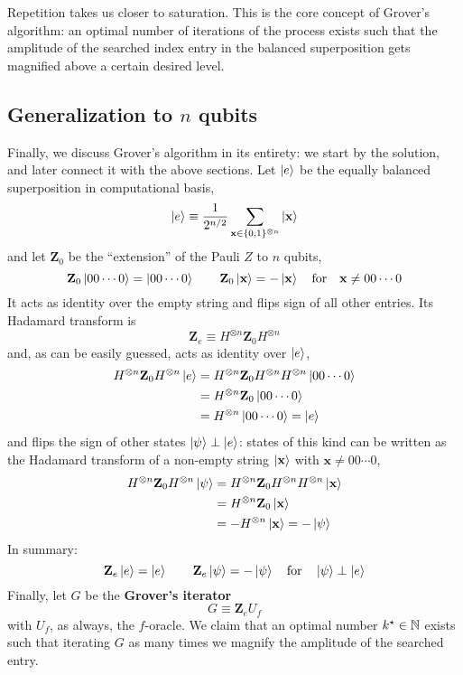 Repetition takes us closer to saturation. This is the core concept of Grover's algorithm: an optimal number of iterations of the process exists such that the amplitude of the searched index entry in the balanced superposition gets magnified above a certain desired level.

\subsection{Generalization to $n$ qubits}

Finally, we discuss Grover's algorithm in its entirety: we start by the solution, and later connect it with the above sections. Let $\ket{e}$ be the equally balanced superposition in computational basis,
\[
	\ket{e} \equiv \frac{1}{2^{n/2}} \sum_{\mathbf{x} \in \lbrace 0,1 \rbrace^{\otimes n}} \ket{\mathbf{x}}
\]
and let $\mathbf{Z}_0$ be the ``extension'' of the Pauli $Z$ to $n$ qubits,
\[
	\mathbf{Z}_0 \ket{00\cdots0} = \ket{00\cdots0}
	\qquad
	\mathbf{Z}_0 \ket{\mathbf{x}} = -\ket{\mathbf{x}} \qq{for} \mathbf{x} \neq 00\cdots0
\]
It acts as identity over the empty string and flips sign of all other entries. Its Hadamard transform is
\[
	\mathbf{Z}_e \equiv H^{\otimes n} \mathbf{Z}_0 H^{\otimes n}
\]
and, as can be easily guessed, acts as identity over $\ket{e}$,
\[
\begin{aligned}
	H^{\otimes n} \mathbf{Z}_0 H^{\otimes n} \ket{e} &= H^{\otimes n} \mathbf{Z}_0 H^{\otimes n} H^{\otimes n} \ket{00\cdots0} \\
	&= H^{\otimes n} \mathbf{Z}_0 \ket{00\cdots0} \\ 
	&= H^{\otimes n} \ket{00\cdots0} = \ket{e}
\end{aligned}
\]
and flips the sign of other states $\ket{\psi} \perp \ket{e}$: states of this kind can be written as the Hadamard transform of a non-empty string $\ket{\mathbf{x}}$ with $\mathbf{x} \neq 00\cdots0$,
\[
\begin{aligned}
	H^{\otimes n} \mathbf{Z}_0 H^{\otimes n} \ket{\psi} &= H^{\otimes n} \mathbf{Z}_0 H^{\otimes n} H^{\otimes n} \ket{\mathbf{x}} \\
	&= H^{\otimes n} \mathbf{Z}_0 \ket{\mathbf{x}} \\ 
	&= - H^{\otimes n} \ket{\mathbf{x}} = - \ket{\psi}
\end{aligned}
\]
In summary:
\[
	\mathbf{Z}_e \ket{e} = \ket{e}
	\qquad
	\mathbf{Z}_e \ket{\psi} = -\ket{\psi} \qq{for} \ket{\psi} \perp \ket{e}
\]
Finally, let $G$ be the \textbf{Grover's iterator}
\[
	G \equiv \mathbf{Z}_e U_f
\]
with $U_f$, as always, the $f$-oracle. We claim that an optimal number $k^\star \in \mathbb{N}$ exists such that iterating $G$ as many times we magnify the amplitude of the searched entry.